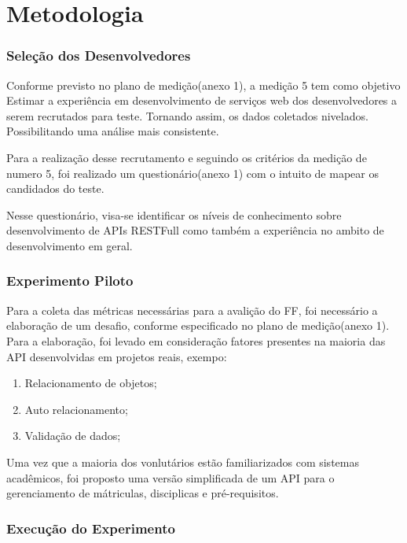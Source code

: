 \chapter[Metodologia]{Metodologia}\label{cap3}

\subsection{Seleção dos Desenvolvedores}

Conforme previsto no plano de medição(anexo 1), a medição 5 tem como objetivo
Estimar a experiência em desenvolvimento de serviços web dos desenvolvedores
a serem recrutados para teste. Tornando assim, os dados coletados nivelados. Possibilitando
uma análise mais consistente.

Para a realização desse recrutamento e seguindo os critérios da medição de numero 5, foi
realizado um questionário(anexo 1) com o intuito de mapear os candidados do teste.

Nesse questionário, visa-se identificar os níveis de conhecimento sobre desenvolvimento
de APIs RESTFull como também a experiência no ambito de desenvolvimento em geral.

\subsection{Experimento Piloto}

Para a coleta das métricas necessárias para a avalição do FF, foi necessário a elaboração
de um desafio, conforme especificado no plano de medição(anexo 1). Para a elaboração, foi levado em consideração
fatores presentes na maioria das API desenvolvidas em projetos reais, exempo:

\begin{enumerate}
  \item Relacionamento de objetos;
  \item Auto relacionamento;
  \item Validação de dados;
\end{enumerate}

Uma vez que a maioria dos vonlutários estão familiarizados com sistemas acadêmicos, foi proposto
uma versão simplificada de um API para o gerenciamento de mátriculas, disciplicas e pré-requisitos.

\subsection{Execução do Experimento}

